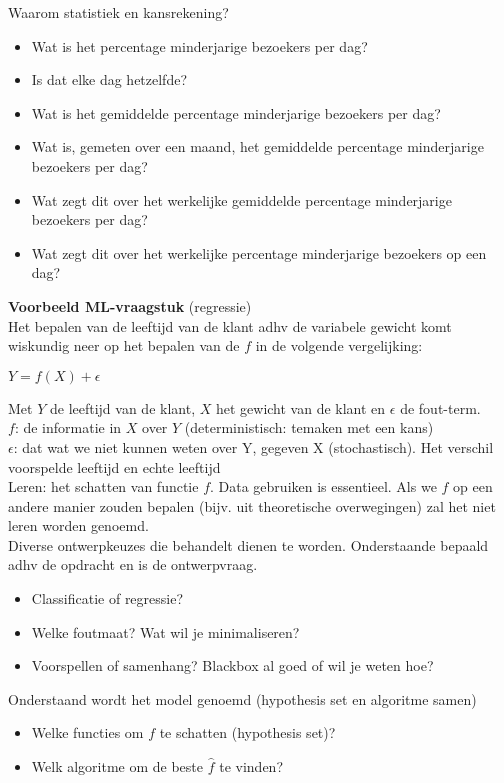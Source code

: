 {\noindent Waarom statistiek en kansrekening?
\begin{itemize}
    \item Wat is het percentage minderjarige bezoekers per dag?
    \item Is dat elke dag hetzelfde?
    \item Wat is het gemiddelde percentage minderjarige bezoekers per dag?
    \item Wat is, gemeten over een maand, het gemiddelde percentage minderjarige bezoekers per dag?
    \item Wat zegt dit over het werkelijke gemiddelde percentage minderjarige bezoekers per dag?
    \item Wat zegt dit over het werkelijke percentage minderjarige bezoekers op een dag?
\end{itemize}\vspace{0.5cm}


\textbf{Voorbeeld ML-vraagstuk} (regressie)\\
\noindent Het bepalen van de leeftijd van de klant adhv de variabele gewicht komt wiskundig neer op het bepalen van de $f$ in de volgende vergelijking:\\
\begin{center}
    $Y=f(X)+\epsilon$\\
\end{center}

\noindent
Met $Y$ de leeftijd van de klant, $X$ het gewicht van de klant en $\epsilon$ de fout-term.\\
$f$: de informatie in $X$ over $Y$ (deterministisch: temaken met een kans)\\
$\epsilon$: dat wat we niet kunnen weten over Y, gegeven X (stochastisch). Het verschil voorspelde leeftijd en echte leeftijd\\

\noindent Leren: het schatten van functie $f$. Data gebruiken is essentieel. Als we $f$ op een andere manier zouden bepalen (bijv. uit theoretische overwegingen) zal het niet leren worden genoemd.\\

\noindent Diverse ontwerpkeuzes die behandelt dienen te worden. Onderstaande bepaald adhv de opdracht en is de ontwerpvraag.\\
\begin{itemize}
    \item Classificatie of regressie?
    \item Welke foutmaat? Wat wil je minimaliseren?
    \item Voorspellen of samenhang? Blackbox al goed of wil je weten hoe?
\end{itemize}\vspace{0.3cm}
\noindent Onderstaand wordt het model genoemd (hypothesis set en algoritme samen)
\begin{itemize}
    \item Welke functies om $f$ te schatten (hypothesis set)?
    \item Welk algoritme om de beste $\hat{f}$ te vinden?
\end{itemize}\vspace{0.5cm}


}
